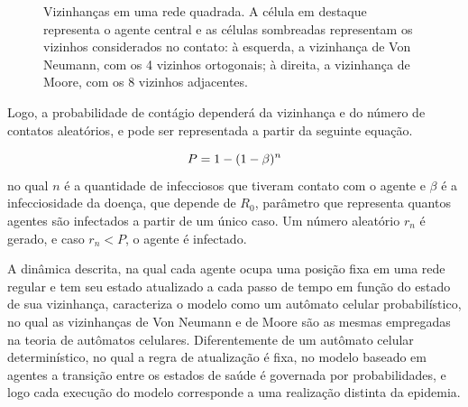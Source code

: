 \documentclass[
	12pt,				%
	openright,			%
	oneside,			%
	a4paper,			%
	english,			%
	french,				%
	spanish,			%
	brazil				%
	]{abntex2}
\begin{document}
\begin{figure}[H]
\centering
{}
\caption{Vizinhanças em uma rede quadrada. A célula em destaque representa o agente central e as células sombreadas representam os vizinhos considerados no contato: à esquerda, a vizinhança de Von Neumann, com os 4 vizinhos ortogonais; à direita, a vizinhança de Moore, com os 8 vizinhos adjacentes.}
\label{fig:vizinhancas}
\end{figure}

Logo, a probabilidade de contágio dependerá da vizinhança e do número de contatos aleatórios, e pode ser representada a partir da seguinte equação.

\begin{equation}\label{eqn:prob}
    \centering
    P = 1 - ( 1 - \beta)^n
\end{equation}
no qual $n$ é a quantidade de infecciosos que tiveram contato com o agente e $\beta$ é a infecciosidade da doença, que depende de $R_0$, parâmetro que representa quantos agentes são infectados a partir de um único caso. Um número aleatório $r_n$ é gerado, e caso $r_n < P$, o agente é infectado.

A dinâmica descrita, na qual cada agente ocupa uma posição fixa em uma rede regular e tem seu estado atualizado a cada passo de tempo em função do estado de sua vizinhança, caracteriza o modelo como um autômato celular probabilístico, no qual as vizinhanças de Von Neumann e de Moore são as mesmas empregadas na teoria de autômatos celulares. Diferentemente de um autômato celular determinístico, no qual a regra de atualização é fixa, no modelo baseado em agentes a transição entre os estados de saúde é governada por probabilidades, e logo cada execução do modelo corresponde a uma realização distinta da epidemia.
\end{document}
